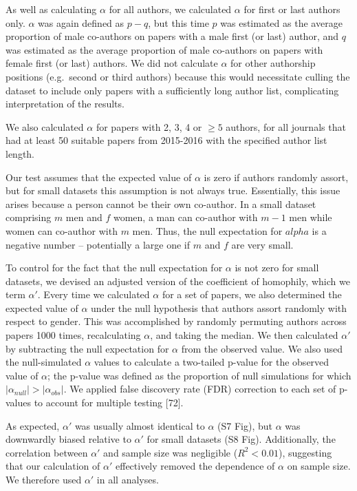 \documentclass[12pt,]{article}
\begin{document}
As well as calculating \(\alpha\) for all authors, we calculated
\(\alpha\) for first or last authors only. \(\alpha\) was again defined
as \(p - q\), but this time \(p\) was estimated as the average
proportion of male co-authors on papers with a male first (or last)
author, and \(q\) was estimated as the average proportion of male
co-authors on papers with female first (or last) authors. We did not
calculate \(\alpha\) for other authorship positions (e.g.~second or
third authors) because this would necessitate culling the dataset to
include only papers with a sufficiently long author list, complicating
interpretation of the results.

We also calculated \(\alpha\) for papers with 2, 3, 4 or \({\ge}5\)
authors, for all journals that had at least 50 suitable papers from
2015-2016 with the specified author list length.

Our test assumes that the expected value of \(\alpha\) is zero if
authors randomly assort, but for small datasets this assumption is not
always true. Essentially, this issue arises because a person cannot be
their own co-author. In a small dataset comprising \(m\) men and \(f\)
women, a man can co-author with \(m - 1\) men while women can co-author
with \(m\) men. Thus, the null expectation for \(alpha\) is a negative
number -- potentially a large one if \(m\) and \(f\) are very small.

To control for the fact that the null expectation for \(\alpha\) is not
zero for small datasets, we devised an adjusted version of the
coefficient of homophily, which we term \(\alpha'\). Every time we
calculated \(\alpha\) for a set of papers, we also determined the
expected value of \(\alpha\) under the null hypothesis that authors
assort randomly with respect to gender. This was accomplished by
randomly permuting authors across papers 1000 times, recalculating
\(\alpha\), and taking the median. We then calculated \(\alpha'\) by
subtracting the null expectation for \(\alpha\) from the observed value.
We also used the null-simulated \(\alpha\) values to calculate a
two-tailed p-value for the observed value of \(\alpha\); the p-value was
defined as the proportion of null simulations for which
\(|\alpha_{null}| > |\alpha_{obs}|\). We applied false discovery rate
(FDR) correction to each set of p-values to account for multiple testing
{[}72{]}.

As expected, \(\alpha'\) was usually almost identical to \(\alpha\) (S7
Fig), but \(\alpha\) was downwardly biased relative to \(\alpha'\) for
small datasets (S8 Fig). Additionally, the correlation between
\(\alpha'\) and sample size was negligible (\(R^2 < 0.01\)), suggesting
that our calculation of \(\alpha'\) effectively removed the dependence
of \(\alpha\) on sample size. We therefore used \(\alpha'\) in all
analyses.
\end{document}
